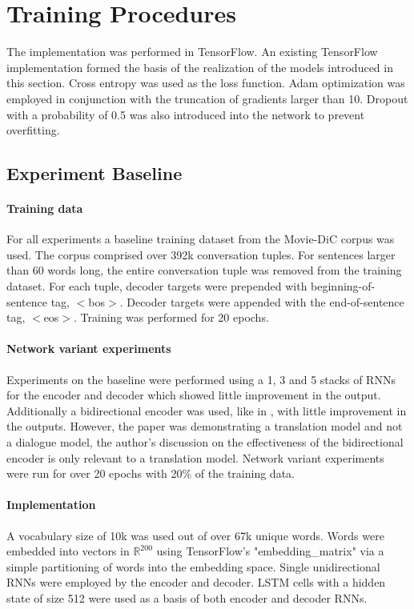 \documentclass[%
 reprint,
 amsmath,amssymb,
 aps,
]{revtex4-1}
\begin{document}
\section{\label{sec:level1}Training Procedures}

The implementation was performed in TensorFlow. An existing TensorFlow implementation \cite{githubmatvey} formed the basis of the realization of the models introduced in this section. Cross entropy was used as the loss function. Adam optimization was employed in conjunction with the truncation of gradients larger than 10. Dropout with a probability of 0.5 was also introduced into the network to prevent overfitting.

\subsection{\label{sec:level2}Experiment Baseline}

\paragraph{Training data}
For all experiments a baseline training dataset from the Movie-DiC corpus was used. The corpus comprised over 392k conversation tuples. For sentences larger than 60 words long, the entire conversation tuple was removed from the training dataset. For each tuple, decoder targets were prepended with beginning-of-sentence tag, $<$bos$>$. Decoder targets were appended with the end-of-sentence tag, $<$eos$>$. Training was performed for 20 epochs.

\paragraph{Network variant experiments}
Experiments on the baseline were performed using a 1, 3 and 5 stacks of RNNs for the encoder and decoder which showed little improvement in the output. Additionally a bidirectional encoder was used, like in \cite{seq2seq}, with little improvement in the outputs. However, the paper was demonstrating a translation model and not a dialogue model, the author's discussion on the effectiveness of the bidirectional encoder is only relevant to a translation model. Network variant experiments were run for over 20 epochs with 20\% of the training data.

\paragraph{Implementation}
A vocabulary size of 10k was used out of over 67k unique words. Words were embedded into vectors in $\mathbb{R}^{200}$ using TensorFlow's "embedding\_matrix" via a simple partitioning of words into the embedding space. Single unidirectional RNNs were employed by the encoder and decoder. LSTM cells with a hidden state of size 512 were used as a basis of both encoder and decoder RNNs.
\end{document}
